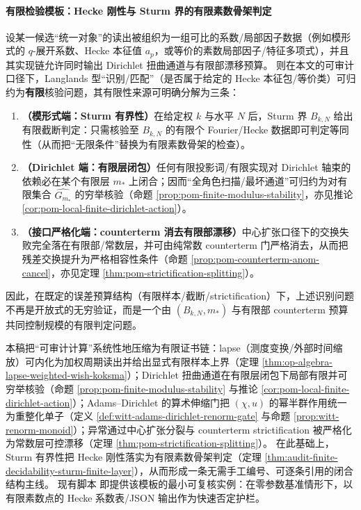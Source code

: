 \paragraph{有限检验模板：Hecke 刚性与 Sturm 界的有限素数骨架判定}
\begin{theorem}\label{thm:audit-finite-decidability-sturm-finite-layer}
设某一候选“统一对象”的读出被组织为一组可比的系数/局部因子数据（例如模形式的 \(q\)-展开系数、Hecke 本征值 \(a_p\)，或等价的素数局部因子/特征多项式），并且其实现链允许同时输出 Dirichlet 扭曲通道与有限部漂移预算。
则在本文的可审计口径下，Langlands 型“识别/匹配”（是否属于给定的 Hecke 本征包/等价类）可归约为\textbf{有限}核验问题，其有限性来源可明确分解为三条：
\begin{enumerate}
  \item \textbf{（模形式端：Sturm 有界性）}在给定权 \(k\) 与水平 \(N\) 后，Sturm 界 \(B_{k,N}\) 给出有限截断判定：只需核验至 \(B_{k,N}\) 的有限个 Fourier/Hecke 数据即可判定等同性（从而把“无限条件”替换为有限素数骨架的检查）。
  \item \textbf{（Dirichlet 端：有限层闭包）}任何有限投影词/有限实现对 Dirichlet 轴束的依赖必在某个有限层 \(m_\ast\) 上闭合；因而“全角色扫描/最坏通道”可归约为对有限集合 \(\widehat{G_{m_\ast}}\) 的穷举核验（命题 \ref{prop:pom-finite-modulus-stability}，亦见推论 \ref{cor:pom-local-finite-dirichlet-action}）。
  \item \textbf{（接口严格化端：counterterm 消去有限部漂移）}中心扩张口径下的交换失败完全落在有限部/常数层，并可由纯常数 counterterm 门严格消去，从而把残差交换提升为严格相容性条件（命题 \ref{prop:pom-counterterm-anom-cancel}，亦见定理 \ref{thm:pom-strictification-splitting}）。
\end{enumerate}
因此，在既定的误差预算结构（有限样本/截断/strictification）下，上述识别问题不再是开放式的无穷验证，而是一个由 \((B_{k,N},m_\ast)\) 与有限部 counterterm 预算共同控制规模的有限判定问题。
\end{theorem}

\begin{remark}\label{rem:audit-summary-lapse-dirichlet-adams-sturm}
本稿把“可审计计算”系统性地压缩为有限证书链：lapse（测度变换/外部时间缩放）可内化为加权周期读出并给出显式有限样本上界（定理 \ref{thm:op-algebra-lapse-weighted-wish-koksma}）；Dirichlet 扭曲通道在有限层闭包下局部有限并可穷举核验（命题 \ref{prop:pom-finite-modulus-stability} 与推论 \ref{cor:pom-local-finite-dirichlet-action}）；Adams--Dirichlet 的算术伸缩门把 \((\chi,u)\) 的幂半群作用统一为重整化单子（定义 \ref{def:witt-adams-dirichlet-renorm-gate} 与命题 \ref{prop:witt-renorm-monoid}）；异常通过中心扩张分裂与 counterterm strictification 被严格化为常数层可控漂移（定理 \ref{thm:pom-strictification-splitting}）。
在此基础上，Sturm 有界性把 Hecke 刚性落实为有限素数骨架判定（定理 \ref{thm:audit-finite-decidability-sturm-finite-layer}），从而形成一条无需手工编号、可逐条引用的闭合结构主线。
现有脚本 \texttt{} 即提供该模板的最小可复核实例：在零参数基准情形下，以有限素数点的 Hecke 系数表/JSON 输出作为快速否定护栏。
\end{remark}

